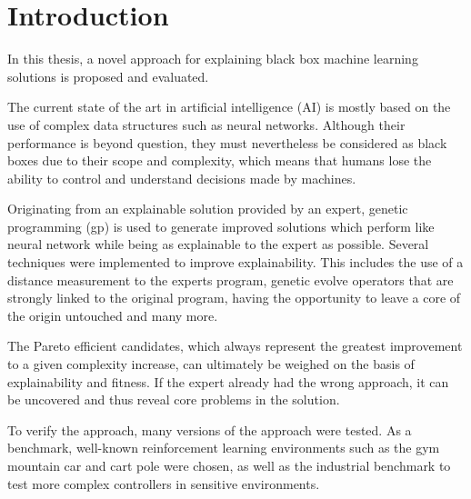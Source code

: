 \chapter{Introduction}

In this thesis, a novel approach for explaining black box machine learning solutions is proposed and evaluated.

The current state of the art in artificial intelligence (AI) is mostly based on the use of complex data structures such as neural networks. Although their performance is beyond question, they must nevertheless be considered as black boxes due to their scope and complexity, which means that humans lose the ability to control and understand decisions made by machines.

Originating from an explainable solution provided by an expert, genetic programming (gp) is used to generate improved solutions which perform like neural network while being as explainable to the expert as possible.
Several techniques were implemented to improve explainability. This includes the use of a distance measurement to the experts program, genetic evolve operators that are strongly linked to the original program, having the opportunity to leave a core of the origin untouched and many more.

The Pareto efficient candidates, which always represent the greatest improvement to a given complexity increase, can ultimately be weighed on the basis of explainability and fitness. If the expert already had the wrong approach, it can be uncovered and thus reveal core problems in the solution.

To verify the approach, many versions of the approach were tested. As a benchmark, well-known reinforcement learning environments such as the gym mountain car and cart pole were chosen, as well as the industrial benchmark to test more complex controllers in sensitive environments.